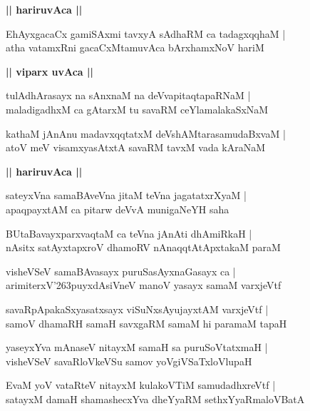 \documentclass[twoside,12pt,openright]{book}
\def\S{\char'263}
\newcounter{shloka}[chapter]
\def\uvaca#1{\centerline{{\large\textbf{#1}}}}
\begin{document}
\uvaca{|| hariruvAca ||}

\begin{shloka}%
EhAyxgacaCx gamiSAxmi tavxyA sAdhaRM ca tadagxqqhaM |\\
atha vatamxRni gacaCxMtamuvAca bArxhamxNoV hariM 
\end{shloka}

\uvaca{|| viparx uvAca ||}

\begin{shloka}%
tulAdhArasayx na sAnxnaM na deVvapitaqtapaRNaM |\\
maladigadhxM ca gAtarxM tu savaRM ceYlamalakaSxNaM
\end{shloka}

\begin{shloka}%
kathaM jAnAnu madavxqqtatxM deVshAMtarasamudaBxvaM |\\
atoV meV visamxyasAtxtA savaRM tavxM vada kAraNaM 
\end{shloka}

\uvaca{|| hariruvAca ||}

\begin{shloka}%
sateyxVna samaBAveVna jitaM teVna jagatatxrXyaM |\\
apaqpayxtAM ca pitarw deVvA munigaNeYH saha
\end{shloka}

\begin{shloka}%
BUtaBavayxparxvaqtaM ca teVna jAnAti dhAmiRkaH |\\
nAsitx satAyxtapxroV dhamoRV nAnaqqtAtApxtakaM paraM 
\end{shloka}

\begin{shloka}%
visheVSeV samaBAvasayx puruSasAyxnaGasayx ca |\\
arimiterxV\S puyxdAsiVneV manoV yasayx samaM varxjeVtf
\end{shloka}

\begin{shloka}%
savaRpApakaSxyasatxsayx viSuNxsAyujayxtAM varxjeVtf |\\
samoV dhamaRH samaH savxgaRM samaM hi paramaM tapaH 
\end{shloka}

\begin{shloka}%
yaseyxYva mAnaseV nitayxM samaH sa puruSoVtatxmaH |\\
visheVSeV savaRloVkeVSu samov yoVgiVSaTxloVlupaH 
\end{shloka}

\begin{shloka}%
EvaM yoV vataRteV nitayxM kulakoVTiM samudadhxreVtf |\\
satayxM damaH shamashecxYva dheYyaRM sethxYyaRmaloVBatA
\end{shloka}
\end{document}
